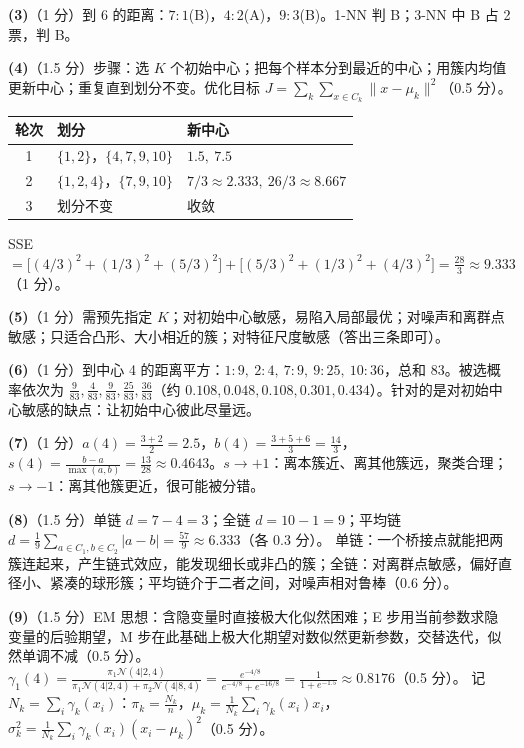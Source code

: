 \textbf{(3)}（1 分）到 6 的距离：$7{:}1$(B)，$4{:}2$(A)，$9{:}3$(B)。1-NN 判 B；3-NN 中 B 占 2 票，判 B。

\textbf{(4)}（1.5 分）步骤：选 $K$ 个初始中心；把每个样本分到最近的中心；用簇内均值更新中心；重复直到划分不变。优化目标 $J=\sum_k\sum_{x\in C_k}\|x-\mu_k\|^2$（0.5 分）。
\begin{center}
\begin{tabular}{cll}
\toprule
轮次 & 划分 & 新中心\\ \midrule
1 & $\{1,2\}$，$\{4,7,9,10\}$ & $1.5,\ 7.5$\\
2 & $\{1,2,4\}$，$\{7,9,10\}$ & $7/3\approx2.333,\ 26/3\approx8.667$\\
3 & 划分不变 & 收敛\\
\bottomrule
\end{tabular}
\end{center}
SSE $=\big[(4/3)^2+(1/3)^2+(5/3)^2\big]+\big[(5/3)^2+(1/3)^2+(4/3)^2\big]=\frac{28}{3}\approx9.333$（1 分）。

\textbf{(5)}（1 分）需预先指定 $K$；对初始中心敏感，易陷入局部最优；对噪声和离群点敏感；只适合凸形、大小相近的簇；对特征尺度敏感（答出三条即可）。

\textbf{(6)}（1 分）到中心 4 的距离平方：$1{:}9,\ 2{:}4,\ 7{:}9,\ 9{:}25,\ 10{:}36$，总和 83。被选概率依次为 $\frac9{83},\frac4{83},\frac9{83},\frac{25}{83},\frac{36}{83}$（约 $0.108,0.048,0.108,0.301,0.434$）。针对的是对初始中心敏感的缺点：让初始中心彼此尽量远。

\textbf{(7)}（1 分）$a(4)=\frac{3+2}{2}=2.5$，$b(4)=\frac{3+5+6}{3}=\frac{14}3$，$s(4)=\frac{b-a}{\max(a,b)}=\frac{13}{28}\approx0.4643$。$s\to+1$：离本簇近、离其他簇远，聚类合理；$s\to-1$：离其他簇更近，很可能被分错。

\textbf{(8)}（1.5 分）单链 $d=7-4=3$；全链 $d=10-1=9$；平均链 $d=\frac19\sum_{a\in C_1,b\in C_2}|a-b|=\frac{57}9\approx6.333$（各 0.3 分）。
单链：一个桥接点就能把两簇连起来，产生链式效应，能发现细长或非凸的簇；全链：对离群点敏感，偏好直径小、紧凑的球形簇；平均链介于二者之间，对噪声相对鲁棒（0.6 分）。

\textbf{(9)}（1.5 分）EM 思想：含隐变量时直接极大化似然困难；E 步用当前参数求隐变量的后验期望，M 步在此基础上极大化期望对数似然更新参数，交替迭代，似然单调不减（0.5 分）。
$\gamma_1(4)=\frac{\pi_1\mathcal N(4|2,4)}{\pi_1\mathcal N(4|2,4)+\pi_2\mathcal N(4|8,4)}=\frac{e^{-4/8}}{e^{-4/8}+e^{-16/8}}=\frac1{1+e^{-1.5}}\approx0.8176$（0.5 分）。
记 $N_k=\sum_i\gamma_k(x_i)$：$\pi_k=\frac{N_k}{n}$，$\mu_k=\frac1{N_k}\sum_i\gamma_k(x_i)x_i$，$\sigma_k^2=\frac1{N_k}\sum_i\gamma_k(x_i)(x_i-\mu_k)^2$（0.5 分）。

